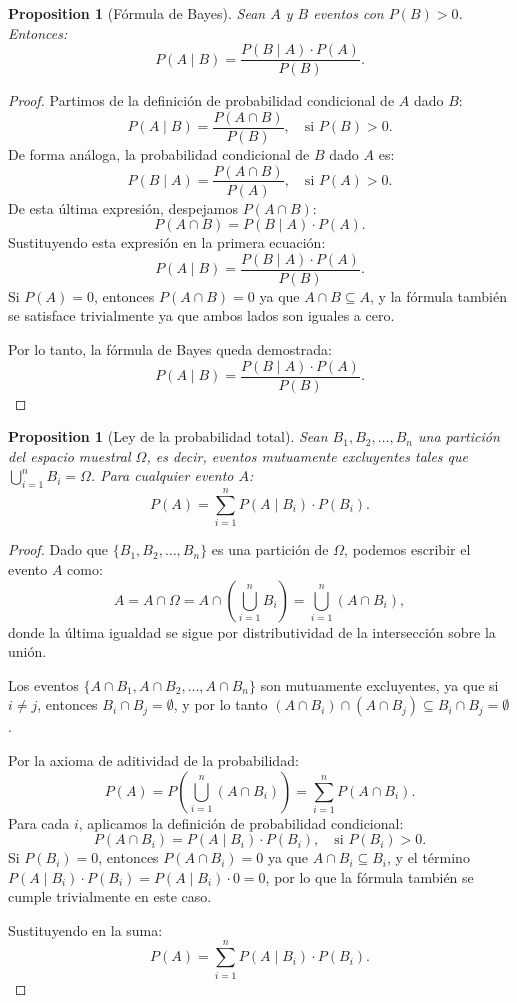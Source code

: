 \documentclass[11pt,a4paper]{article}
\theoremstyle{plain}
\newtheorem{proposition}[theorem]{Proposition}
\theoremstyle{definition}
\begin{document}
\begin{proposition}[Fórmula de Bayes]
Sean $A$ y $B$ eventos con $P(B) > 0$. Entonces:
\[
P(A \mid B) = \frac{P(B \mid A) \cdot P(A)}{P(B)}.
\]
\end{proposition}

\begin{proof}
Partimos de la definición de probabilidad condicional de $A$ dado $B$:
\[
P(A \mid B) = \frac{P(A \cap B)}{P(B)}, \quad \text{si } P(B) > 0.
\]
De forma análoga, la probabilidad condicional de $B$ dado $A$ es:
\[
P(B \mid A) = \frac{P(A \cap B)}{P(A)}, \quad \text{si } P(A) > 0.
\]
De esta última expresión, despejamos $P(A \cap B)$:
\[
P(A \cap B) = P(B \mid A) \cdot P(A).
\]
Sustituyendo esta expresión en la primera ecuación:
\[
P(A \mid B) = \frac{P(B \mid A) \cdot P(A)}{P(B)}.
\]
Si $P(A) = 0$, entonces $P(A \cap B) = 0$ ya que $A \cap B \subseteq A$, y la fórmula también se satisface trivialmente ya que ambos lados son iguales a cero.

Por lo tanto, la fórmula de Bayes queda demostrada:
\[
\boxed{P(A \mid B) = \frac{P(B \mid A) \cdot P(A)}{P(B)}}.
\]
\end{proof}

\begin{proposition}[Ley de la probabilidad total]
Sean $B_1, B_2, \ldots, B_n$ una partición del espacio muestral $\Omega$, es decir, eventos mutuamente excluyentes tales que $\bigcup_{i=1}^n B_i = \Omega$. Para cualquier evento $A$:
\[
P(A) = \sum_{i=1}^{n} P(A \mid B_i) \cdot P(B_i).
\]
\end{proposition}

\begin{proof}
Dado que $\{B_1, B_2, \ldots, B_n\}$ es una partición de $\Omega$, podemos escribir el evento $A$ como:
\[
A = A \cap \Omega = A \cap \left( \bigcup_{i=1}^{n} B_i \right) = \bigcup_{i=1}^{n} (A \cap B_i),
\]
donde la última igualdad se sigue por distributividad de la intersección sobre la unión.

Los eventos $\{A \cap B_1, A \cap B_2, \ldots, A \cap B_n\}$ son mutuamente excluyentes, ya que si $i \neq j$, entonces $B_i \cap B_j = \emptyset$, y por lo tanto $(A \cap B_i) \cap (A \cap B_j) \subseteq B_i \cap B_j = \emptyset$.

Por la axioma de aditividad de la probabilidad:
\[
P(A) = P\left( \bigcup_{i=1}^{n} (A \cap B_i) \right) = \sum_{i=1}^{n} P(A \cap B_i).
\]
Para cada $i$, aplicamos la definición de probabilidad condicional:
\[
P(A \cap B_i) = P(A \mid B_i) \cdot P(B_i), \quad \text{si } P(B_i) > 0.
\]
Si $P(B_i) = 0$, entonces $P(A \cap B_i) = 0$ ya que $A \cap B_i \subseteq B_i$, y el término $P(A \mid B_i) \cdot P(B_i) = P(A \mid B_i) \cdot 0 = 0$, por lo que la fórmula también se cumple trivialmente en este caso.

Sustituyendo en la suma:
\[
P(A) = \sum_{i=1}^{n} P(A \mid B_i) \cdot P(B_i).
\]
\end{proof}
\end{document}
